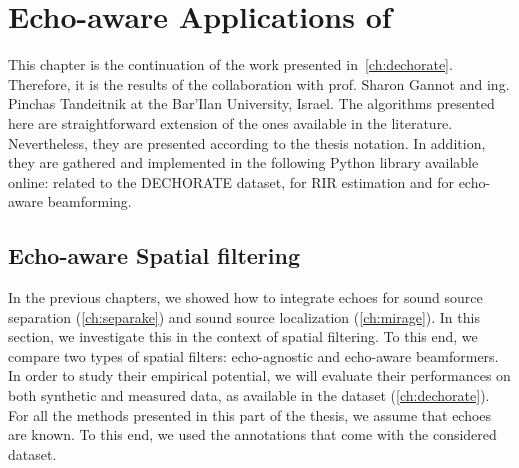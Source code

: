 \chapter{Echo-aware Applications of \dEchorate{}}\label{ch:dechorateapp}

\vspace{-2.5em}
  \synopsisChDecharateApp

\mynewline
This chapter is the continuation of the work presented in~\cref{ch:dechorate}.
Therefore, it is the results of the collaboration with prof. Sharon Gannot and ing. Pinchas Tandeitnik at the Bar'Ilan University, Israel.
The algorithms presented here are straightforward extension of the ones available in the literature.
Nevertheless, they are presented according to the thesis notation.
In addition, they are  gathered and implemented in the following Python library available online:
 related to the \ac{DECHORATE} dataset,  for \acs{RIR} estimation and  for echo-aware beamforming.

\section{Echo-aware Spatial filtering}\label{sec:dechorateapp:se}
In the previous chapters, we showed how to integrate echoes for sound source separation (\cref{ch:separake}) and sound source localization (\cref{ch:mirage}).
In this section, we investigate this in the context of spatial filtering.
To this end, we compare two types of spatial filters: echo-agnostic and echo-aware beamformers.
In order to study their empirical potential, we will evaluate their performances on both synthetic and measured data, as available in the \dEchorate{} dataset (\cref{ch:dechorate}).
For all the methods presented in this part of the thesis, we assume that echoes are known.
To this end, we used the annotations that come with the considered dataset.

